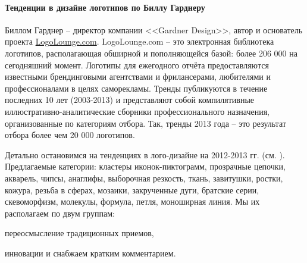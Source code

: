 \paragraph{Тенденции в дизайне логотипов по Биллу Гарднеру}

Биллом Гарднер -- директор компании <<Gardner Design>>, автор и основатель проекта
\url{LogoLounge.com}. LogoLounge.com -- это электронная библиотека логотипов, располагающая обширной и
пополняющейся базой: более 206 000 на сегодняшний момент. Логотипы для ежегодного отчёта
предоставляются известными брендинговыми агентствами и фрилансерами, любителями и профессионалами в
целях саморекламы. Тренды публикуются в течение последних 10 лет (2003-2013) и представляют собой
компилятивные иллюстративно-аналитические сборники профессионального назначения, организованные по
категориям отбора. Так, тренды 2013 года -- это результат отбора более чем 20 000 логотипов.
\autocite{link:logolounge2012}\autocite{link:logolounge2013}

Детально остановимся на тенденциях в лого-дизайне на 2012-2013 гг.
(см. \appendixname \label{app:logotrends}). Предлагаемые категории: кластеры иконок-пиктограмм,
прозрачные цепочки, акварель, чипсы, анаглифы, выборочная резкость, ткань, завитушки, ростки,
кожура, резьба в сферах, мозаики, закрученные дуги, братские серии, скевоморфизм, молекулы, формула,
петля, моноширная линия.  Мы их располагаем по двум группам:
\begin{enumerate*}[label=\asbuk*)]
\item переосмысление традиционных приемов,
\item инновации  и снабжаем кратким комментарием.
\end{enumerate*}

